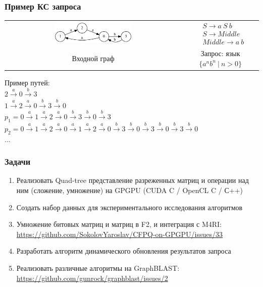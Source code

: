 \documentclass[xcolor=table]{beamer}
\begin{document}
\begin{frame} \frametitle{Пример КС запроса}
\begin{center}
  \begin{tabular}{  c  c  }
      \includegraphics[width=0.45\textwidth]{pictures/input.pdf}
      &
  $

  \begin{array}{rl}
     & S \rightarrow a \ S \ b \\
     & S \rightarrow Middle \\
     & Middle \rightarrow a \ b
  \end{array}

  $
  \\
  Входной граф
  &
  Запрос: язык $\{a^nb^n \ | \ n > 0 \}$ 

  \end{tabular}

\end{center}

\pause

\vspace{0.5cm}
Пример путей: \\
$2 \xrightarrow{a} 0 \xrightarrow{b} 3$ \\
$1 \xrightarrow{a} 2 \xrightarrow{a} 0 \xrightarrow{b} 3 \xrightarrow{b} 0$ \\
$p_1 = 0 \xrightarrow{a} 1 \xrightarrow{a} 2 \xrightarrow{a} 0 \xrightarrow{b} 3 \xrightarrow{b} 0 \xrightarrow{b} 3$ \\
$p_2 = 0 \xrightarrow{a} 1 \xrightarrow{a} 2 \xrightarrow{a} 0 \xrightarrow{a} 1 \xrightarrow{a} 2 \xrightarrow{a} 0 \xrightarrow{b} 3 \xrightarrow{b} 0 \xrightarrow{b} 3 \xrightarrow{b} 0 \xrightarrow{b} 3 \xrightarrow{b} 0$ \\
$\dots$

\end{frame}

\begin{frame}[fragile] \frametitle{Задачи}
  \begin{enumerate}
    \item Реализовать Quad-tree представление разреженных матриц и операции над ним (сложение, умножение) на GPGPU (CUDA C / OpenCL C / С++)
    \pause
    \item Создать набор данных для экспериментального исследования алгоритмов
    \pause
    \item Умножение битовых матриц и матриц в F2, и интеграция с M4RI: \url{https://github.com/SokolovYaroslav/CFPQ-on-GPGPU/issues/33}
    \pause
    \item Разработать алгоритм динамического обновления результатов запроса
    \pause
    \item Реализовать различные алгоритмы на GraphBLAST: \url{https://github.com/gunrock/graphblast/issues/2}
  \end{enumerate}
\end{frame}
\end{document}
